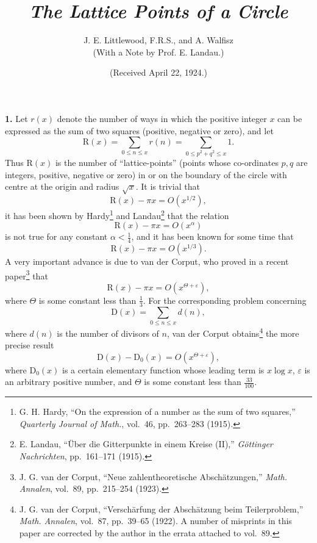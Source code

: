 \documentclass[11pt]{article}
\title{\textit{The Lattice Points of a Circle}}
\author{J. E. Littlewood, F.R.S., and A. Walfisz\\
\large (With a Note by Prof. E. Landau.)}
\date{(Received April 22, 1924.)}
\begin{document}
\maketitle

\noindent\textbf{1.}
Let $r(x)$ denote the number of ways in which the positive integer $x$ can
be expressed as the sum of two squares (positive, negative or zero), and let
\[
 \mathrm{R}(x)=\sum_{0\leq n\leq x}r(n)
 =\sum_{0\leq p^2+q^2\leq x}1.
\]
Thus $\mathrm{R}(x)$ is the number of ``lattice-points'' (points whose
co-ordinates $p,q$ are integers, positive, negative or zero) in or on the
boundary of the circle with centre at the origin and radius $\sqrt{x}$. It is
trivial that
\begin{equation}
 \mathrm{R}(x)-\pi x=O\!\left(x^{1/2}\right),
 \tag{1.1}
\end{equation}
it has been shown by Hardy\footnote{G. H. Hardy, ``On the expression of a
number as the sum of two squares,'' \textit{Quarterly Journal of Math.},
vol.~46, pp.~263--283 (1915).} and Landau\footnote{E. Landau, ``Über die
Gitterpunkte in einem Kreise (II),'' \textit{Göttinger Nachrichten},
pp.~161--171 (1915).} that the relation
\[
 \mathrm{R}(x)-\pi x=O\!\left(x^\alpha\right)
\]
is not true for any constant $\alpha<\tfrac14$, and it has been known for
some time that
\[
 \mathrm{R}(x)-\pi x=O\!\left(x^{1/3}\right).
\]
A very important advance is due to van der Corput, who proved in a recent
paper\footnote{J. G. van der Corput, ``Neue zahlentheoretische
Abschätzungen,'' \textit{Math. Annalen}, vol.~89, pp.~215--254 (1923).} that
\begin{equation}
 \mathrm{R}(x)-\pi x=O\!\left(x^{\Theta+\varepsilon}\right),
 \tag{1.2}
\end{equation}
where $\Theta$ is some constant less than $\tfrac13$. For the corresponding
problem concerning
\[
 \mathrm{D}(x)=\sum_{0\leq n\leq x}d(n),
\]
where $d(n)$ is the number of divisors of $n$, van der Corput obtains\footnote{
J. G. van der Corput, ``Verschärfung der Abschätzung beim Teilerproblem,''
\textit{Math. Annalen}, vol.~87, pp.~39--65 (1922). A number of misprints in
this paper are corrected by the author in the errata attached to vol.~89.}
the more precise result
\begin{equation}
 \mathrm{D}(x)-\mathrm{D}_0(x)=O\!\left(x^{\Theta+\varepsilon}\right),
 \tag{1.3}
\end{equation}
where $\mathrm{D}_0(x)$ is a certain elementary function whose leading term
is $x\log x$, $\varepsilon$ is an arbitrary positive number, and $\Theta$ is
some constant less than $\tfrac{33}{100}$.
\end{document}
